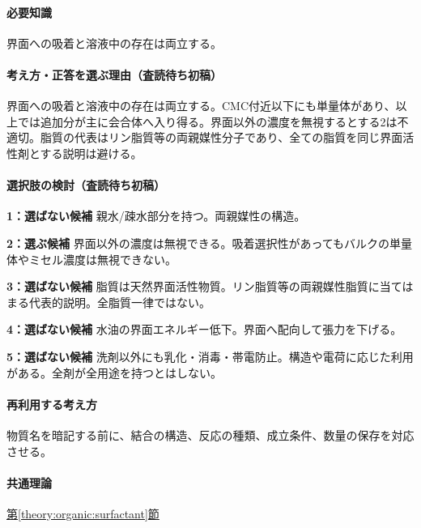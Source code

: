 \paragraph{必要知識} 界面への吸着と溶液中の存在は両立する。

\paragraph{考え方・正答を選ぶ理由（査読待ち初稿）} 界面への吸着と溶液中の存在は両立する。CMC付近以下にも単量体があり、以上では追加分が主に会合体へ入り得る。界面以外の濃度を無視するとする2は不適切。脂質の代表はリン脂質等の両親媒性分子であり、全ての脂質を同じ界面活性剤とする説明は避ける。

\paragraph{選択肢の検討（査読待ち初稿）}\mbox{}\par

\noindent\textbf{1：選ばない候補} 親水/疎水部分を持つ。両親媒性の構造。\par

\noindent\textbf{2：選ぶ候補} 界面以外の濃度は無視できる。吸着選択性があってもバルクの単量体やミセル濃度は無視できない。\par

\noindent\textbf{3：選ばない候補} 脂質は天然界面活性物質。リン脂質等の両親媒性脂質に当てはまる代表的説明。全脂質一律ではない。\par

\noindent\textbf{4：選ばない候補} 水油の界面エネルギー低下。界面へ配向して張力を下げる。\par

\noindent\textbf{5：選ばない候補} 洗剤以外にも乳化・消毒・帯電防止。構造や電荷に応じた利用がある。全剤が全用途を持つとはしない。\par

\paragraph{再利用する考え方} 物質名を暗記する前に、結合の構造、反応の種類、成立条件、数量の保存を対応させる。

\paragraph{共通理論} \hyperref[theory:organic:surfactant]{第\ref*{theory:organic:surfactant}節}

